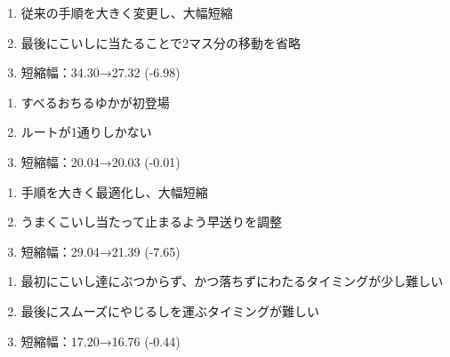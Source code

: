 \begin{enumerate}[label={\sarrow}]
\item 従来の手順を大きく変更し、大幅短縮
\item 最後にこいしに当たることで2マス分の移動を省略
\item 短縮幅：34.30→27.32 (-6.98)
\end{enumerate}



\begin{enumerate}[label={\sarrow}]
\item すべるおちるゆかが初登場
\item ルートが1通りしかない
\item 短縮幅：20.04→20.03 (-0.01)
\end{enumerate}



\begin{enumerate}[label={\sarrow}]
\item 手順を大きく最適化し、大幅短縮
\item うまくこいし当たって止まるよう早送りを調整
\item 短縮幅：29.04→21.39 (-7.65)
\end{enumerate}



\begin{enumerate}[label={\sarrow}]
\item 最初にこいし達にぶつからず、かつ落ちずにわたるタイミングが少し難しい
\item 最後にスムーズにやじるしを運ぶタイミングが難しい
\item 短縮幅：17.20→16.76 (-0.44)
\end{enumerate}



